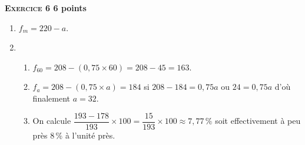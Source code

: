 \textbf{\textsc{Exercice 6} \hfill 6 points}

\medskip

%
%

\begin{enumerate}
\item %
$f_m = 220 - a$. 
\item %



	\begin{enumerate}
		\item %
$f_{60} =  208 - (0,75 \times 60) = 208 - 45 = 163$.
		\item %
		$f_a = 208 - (0,75 \times a) = 184$ si $208 - 184 = 0,75a$ ou $24 = 0,75a$ d'où finalement $a = 32$. 
		\item %
		


On calcule $\dfrac{193 - 178}{193} \times 100 = \dfrac{15}{193} \times 100 \approx 7,77\,\%$ soit effectivement à peu près 8\,\% à l'unité près.
	\end{enumerate} 
\end{enumerate}

\vspace{0,5cm}

